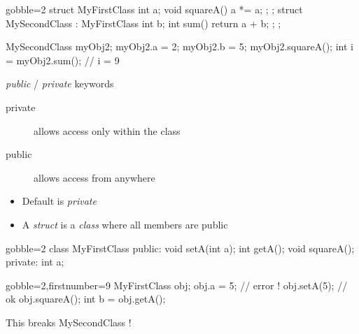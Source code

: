 \begin{frame}[fragile]
  \begin{multicols}{2}
    \begin{cppcode*}{gobble=2}
      struct MyFirstClass {
        int a;
        void squareA() { a *= a; };
      };
      struct MySecondClass :
        MyFirstClass {
        int b;
        int sum() { return a + b; };
      };

      MySecondClass myObj2;
      myObj2.a = 2;
      myObj2.b = 5;
      myObj2.squareA();
      int i = myObj2.sum(); // i = 9
    \end{cppcode*}
    \columnbreak
    \center
    \null \vfill
    \vfill \null
  \end{multicols}
\end{frame}

\begin{frame}[fragile]
  \begin{block}{{\it public} \color{white} / {\it private} keywords}
    \begin{description}
      \item[private] allows access only within the class
      \item[public] allows access from anywhere
    \end{description}
    \begin{itemize}
      \item Default is {\it private}
      \item A {\it struct} is a {\it class} where all members are public
    \end{itemize}
  \end{block}
  \pause
  \begin{multicols}{2}
    \begin{cppcode*}{gobble=2}
      class MyFirstClass {
      public:
        void setA(int a);
        int getA();
        void squareA();
      private:
        int a;
      }
    \end{cppcode*}
    \columnbreak
    \begin{cppcode*}{gobble=2,firstnumber=9}
      MyFirstClass obj;
      obj.a = 5;   // error !
      obj.setA(5); // ok
      obj.squareA();
      int b = obj.getA();
    \end{cppcode*}
    \pause
    \begin{tcolorbox}[left=0mm,right=0mm,top=0mm,bottom=0mm,colback=red!5!white,colframe=red!75!black]
      This breaks MySecondClass !
    \end{tcolorbox}
  \end{multicols}
\end{frame}


